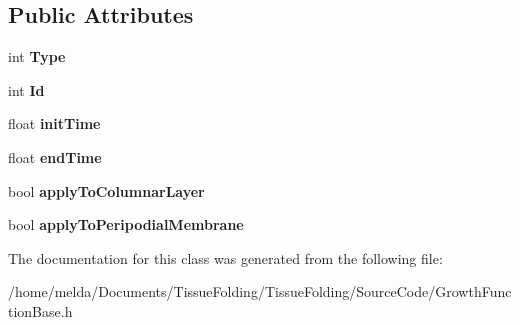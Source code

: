 \subsection*{Public Attributes}
\begin{DoxyCompactItemize}
\item 
\hypertarget{classGrowthFunctionBase_a90fc4b14e2adcda0930fe93b1490fb7a}{}int {\bfseries Type}\label{classGrowthFunctionBase_a90fc4b14e2adcda0930fe93b1490fb7a}

\item 
\hypertarget{classGrowthFunctionBase_aa669a940ab77009f9b2b9c9885e9cd9e}{}int {\bfseries Id}\label{classGrowthFunctionBase_aa669a940ab77009f9b2b9c9885e9cd9e}

\item 
\hypertarget{classGrowthFunctionBase_ae92513a7b41637df8e26e7db35ddf97c}{}float {\bfseries init\+Time}\label{classGrowthFunctionBase_ae92513a7b41637df8e26e7db35ddf97c}

\item 
\hypertarget{classGrowthFunctionBase_a3ff4db0573d354a75666a5f3ca446941}{}float {\bfseries end\+Time}\label{classGrowthFunctionBase_a3ff4db0573d354a75666a5f3ca446941}

\item 
\hypertarget{classGrowthFunctionBase_a3d56771e7c145589a14e11cc331e0326}{}bool {\bfseries apply\+To\+Columnar\+Layer}\label{classGrowthFunctionBase_a3d56771e7c145589a14e11cc331e0326}

\item 
\hypertarget{classGrowthFunctionBase_a08ae19f58cb98fa8e315a77f52749732}{}bool {\bfseries apply\+To\+Peripodial\+Membrane}\label{classGrowthFunctionBase_a08ae19f58cb98fa8e315a77f52749732}

\end{DoxyCompactItemize}


The documentation for this class was generated from the following file\+:\begin{DoxyCompactItemize}
\item 
/home/melda/\+Documents/\+Tissue\+Folding/\+Tissue\+Folding/\+Source\+Code/Growth\+Function\+Base.\+h\end{DoxyCompactItemize}
